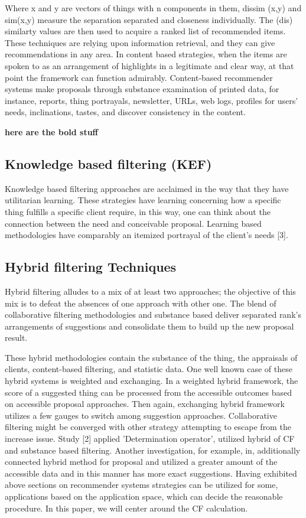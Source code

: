 \documentclass[10pt,conference]{IEEEtran}
\begin{document}
Where x and y are vectors of things with n components in them, dissim (x,y) and sim(x,y) measure the separation separated and closeness individually. The (dis) similarty values are then used to acquire a ranked list of recommended items. These techniques are relying upon information retrieval, and they can give recommendations in any area. In content based strategies, when the items are spoken to as an arrangement of highlights in a legitimate and clear way, at that point the framework can function admirably. Content-based recommender systems make proposals through substance examination of printed data, for instance, reports, thing portrayals, newsletter, URLs, web logs, profiles for users' needs, inclinations, tastes, and discover consistency in the content.

\textbf{here are the bold stuff}

\subsection{Knowledge based filtering (KEF)}
Knowledge based filtering approaches are acclaimed in the way that they have utilitarian learning. These strategies have learning concerning how a specific thing fulfills a specific client require, in this way, one can think about the connection between the need and conceivable proposal. Learning based methodologies have comparably an itemized portrayal of the client's needs [3].


\subsection{Hybrid filtering Techniques}
Hybrid filtering alludes to a mix of at least two approaches; the objective of this mix is to defeat the absences of one approach with other one. The blend of collaborative filtering methodologies and substance based deliver separated rank's arrangements of suggestions and consolidate them to build up the new proposal result.

These hybrid methodologies contain the substance of the thing, the appraisals of clients, content-based filtering, and statistic data. One well known case of these hybrid systems is weighted and exchanging. In a weighted hybrid framework, the score of a suggested thing can be processed from the accessible outcomes based on accessible proposal approaches. Then again, exchanging hybrid framework utilizes a few gauges to switch among suggestion approaches. Collaborative filtering might be converged with other strategy attempting to escape from the increase issue. Study [2] applied 'Determination operator', utilized hybrid of CF and substance based filtering. Another investigation, for example, in, additionally connected hybrid method for proposal and utilized a greater amount of the accessible data and in this manner has more exact suggestions.
Having exhibited above sections on recommender systems strategies can be utilized for some, applications based on the application space, which can decide the reasonable procedure. In this paper, we will center around the CF calculation. 
\end{document}
